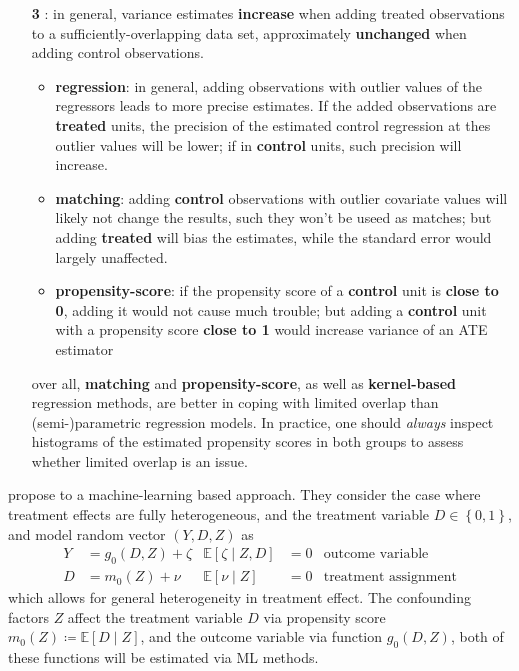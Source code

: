 \documentclass[twoside]{article}
\begin{document}
\begin{itemize}
    \item[\textbf{3}] : in general, variance estimates \textbf{increase} when adding treated observations to a sufficiently-overlapping data set, approximately \textbf{unchanged} when adding control observations.
    \begin{itemize}
        \item \textbf{regression}: in general, adding observations with outlier values of the regressors leads to more precise estimates. If the added observations are \textbf{treated} units, the precision of the estimated control regression at thes outlier values will be lower; if in \textbf{control} units, such precision will increase.
        \item \textbf{matching}: adding \textbf{control} observations with outlier covariate values will likely not change the results, such they won't be useed as matches; but adding \textbf{treated} will bias the estimates, while the standard error would largely unaffected.
        \item \textbf{propensity-score}: if the propensity score of a \textbf{control} unit is \textbf{close to 0}, adding it would not cause much trouble; but adding a \textbf{control} unit with a propensity score \textbf{close to 1} would increase variance of an ATE estimator
    \end{itemize}
    over all, \textbf{matching} and \textbf{propensity-score}, as well as \textbf{kernel-based} regression methods, are better in coping with limited overlap than (semi-)parametric regression models. In practice, one should \textit{always} inspect histograms of the estimated propensity scores in both groups to assess whether limited overlap is an issue.
\end{itemize}

\citet{chernozhukov2017double} propose to a machine-learning based approach. They consider the case where treatment effects are fully heterogeneous, and the treatment variable $D\in \left\{0,1\right\}$, and model random vector $\left(Y,D,Z\right)$ as 
\begin{align*}
    Y&= g_0\left(D,Z\right)+\zeta & \mathbb{E}\left[\zeta \mid Z,D\right]&=0 & \text{outcome variable}\\
    D&= m_0\left(Z\right) + \nu & \mathbb{E}\left[\nu\mid Z\right] &=0 & \text{treatment assignment}
\end{align*}
which allows for general heterogeneity in treatment effect. The confounding factors $Z$ affect the treatment variable $D$ via propensity score $m_0(Z)\coloneq \mathbb{E}\left[D\mid Z\right]$, and the outcome variable via function $g_0(D,Z)$, both of these functions will be estimated via ML methods.
\end{document}
